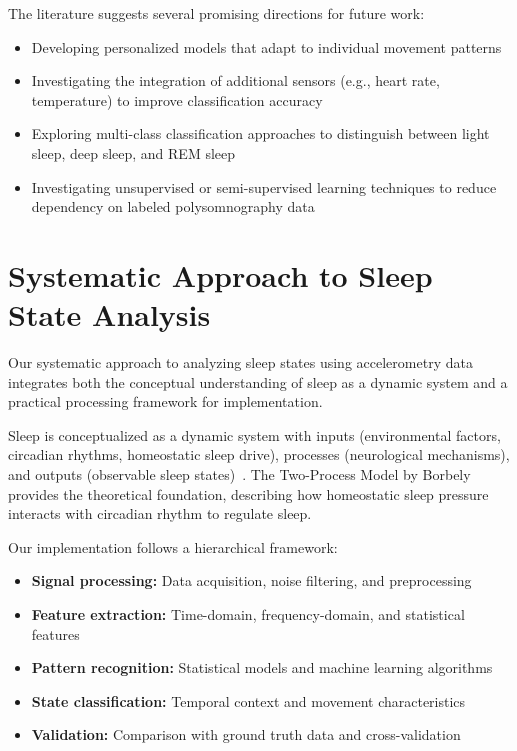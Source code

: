 \documentclass[conference]{IEEEtran}
\begin{document}
The literature suggests several promising directions for future work:

\begin{itemize}
	\item Developing personalized models that adapt to individual movement patterns~\cite{sadeh2011, vanHees2015}
	\item Investigating the integration of additional sensors (e.g., heart rate, temperature) to improve classification accuracy~\cite{behar2013, griessenberger2013}
	\item Exploring multi-class classification approaches to distinguish between light sleep, deep sleep, and REM sleep~\cite{griessenberger2013}
	\item Investigating unsupervised or semi-supervised learning techniques to reduce dependency on labeled polysomnography data~\cite{zhang2020machine}
\end{itemize}

\section{Systematic Approach to Sleep State Analysis}

Our systematic approach to analyzing sleep states using accelerometry data integrates both the conceptual understanding of sleep as a dynamic system and a practical processing framework for implementation.

Sleep is conceptualized as a dynamic system with inputs (environmental factors, circadian rhythms, homeostatic sleep drive), processes (neurological mechanisms), and outputs (observable sleep states)~\cite{carskadon2005normal, borbely1982}. The Two-Process Model by Borbely~\cite{borbely1982} provides the theoretical foundation, describing how homeostatic sleep pressure interacts with circadian rhythm to regulate sleep.

Our implementation follows a hierarchical framework:
\begin{itemize}
	\item \textbf{Signal processing:} Data acquisition, noise filtering, and preprocessing~\cite{ancoli2003role, vanHees2015}
	\item \textbf{Feature extraction:} Time-domain, frequency-domain, and statistical features~\cite{sadeh1994activity, kushida2001}
	\item \textbf{Pattern recognition:} Statistical models and machine learning algorithms~\cite{zhang2020machine, behar2013}
	\item \textbf{State classification:} Temporal context and movement characteristics~\cite{rechtschaffen1968, littner2003}
	\item \textbf{Validation:} Comparison with ground truth data and cross-validation~\cite{kushida2001, sadeh2011}
\end{itemize}
\end{document}
